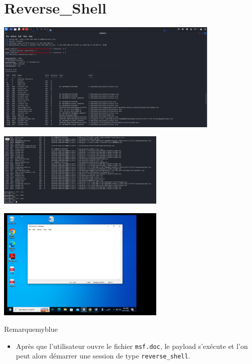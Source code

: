 \section{Reverse\_Shell}

\begin{center}
    \includegraphics[width=0.8\textwidth]{Question/SC/ps.PNG}
\end{center}

\vspace{0.15cm}

\begin{center}
    \includegraphics[width=0.6\textwidth]{Question/SC/kill_kali.PNG}
\end{center}

\vspace{0.15cm}

\begin{center}
    \includegraphics[width=0.6\textwidth]{Question/SC/kill.PNG}
\end{center}


\vspace{0.35cm}


\begin{prettyBox}{Remarque}{myblue}
    \begin{itemize}
        \item Après que l'utilisateur ouvre le fichier \texttt{msf.doc}, le payload s'exécute et l'on peut alors démarrer une session de type \texttt{reverse\_shell}.
    \end{itemize}
\end{prettyBox}

